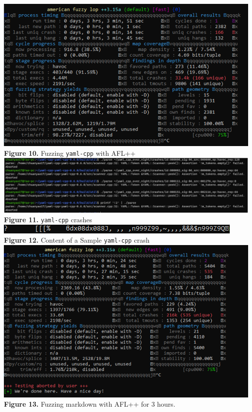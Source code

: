 \documentclass[12pt]{diazessay}
\begin{document}
\vspace{-6mm}
\begin{center}
	\includegraphics[scale=1.0, trim={0 0 7mm 0}, clip]{yamlfuzzer.png}\\
	\textbf{Figure 10.} Fuzzing \texttt{yaml-cpp} with AFL++\\
\vspace{6mm}
	\includegraphics[scale=0.45, trim={0 3cm 0 0}, clip]{yaml_cpp_crashes.png}\\
	\textbf{Figure 11.} \texttt{yaml-cpp} crashes\\
\vspace{6mm}
	\includegraphics[scale=1.0]{yamlsamplecrashcat.png}\\
	\textbf{Figure 12.} Content of a Sample \texttt{yaml-cpp} crash\\
\vspace{6mm}
	\includegraphics[scale=0.7, trim={0 0 1.5cm 0}, clip]{markdownfuzzer.png}\\
	\textbf{Figure 13.} Fuzzing markdown with AFL++ for 3 hours.\\
\end{center}
\vspace{6mm}
\end{document}
